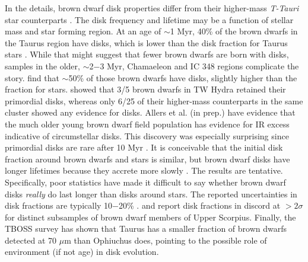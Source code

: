 \documentclass[12pt,preprint]{aastex}
\begin{document}
In the details, brown dwarf disk properties differ from their higher-mass \emph{T-Tauri} star counterparts \citep{2009ApJ...696..143P}.  The disk frequency and lifetime may be a function of stellar mass and star forming region.  At an age of $\sim$1 Myr, 40\% of the brown dwarfs in the Taurus region have disks, which is lower than the disk fraction for Taurus stars \citep{2006ApJ...645..676L}.  While that might suggest that fewer brown dwarfs are born with disks, samples in the older, $\sim$2$-$3 Myr, Chamaeleon and IC 348 regions complicate the story.  \cite{2005ApJ...631L..69L} find that $\sim$50\% of those brown dwarfs have disks, slightly higher than the fraction for stars.  \citet{2008ApJ...681.1584R} showed that 3/5 brown dwarfs in TW Hydra retained their primordial disks, whereas only 6/25 of their higher-mass counterparts in the same cluster showed any evidence for disks.  Allers et al. (in prep.) have evidence that the much older young brown dwarf field population has evidence for IR excess indicative of circumstellar disks.  This discovery was especially surprising since primordial disks are rare after 10 Myr \citep{2011ARA&A..49...67W}.  It is conceivable that the initial disk fraction around brown dwarfs and stars is similar, but brown dwarf disks have longer lifetimes because they accrete more slowly \citep{2007ApJ...657..511A}.  The results are tentative.  Specifically, poor statistics have made it difficult to say whether brown dwarf disks \emph{really} do last longer than disks around stars.  The reported uncertainties in disk fractions are typically 10$-$20\% \citep{2012MNRAS.420.2497R}.  \citet{2007ApJ...660.1517S} and \citet{2009ApJ...705.1173R} report disk fractions in discord at $>2\sigma$ for distinct subsamples of brown dwarf members of Upper Scorpius.  Finally, the TBOSS survey has shown that Taurus has a smaller fraction of brown dwarfs detected at 70 $\mu$m than Ophiuchus does, pointing to the possible role of environment (if not age) in disk evolution. \citep{2014A&A...570A..29B}
\end{document}
